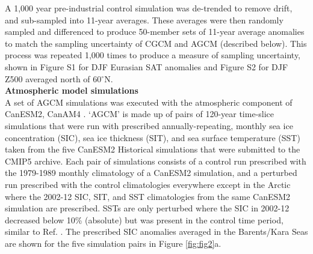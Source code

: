 \documentclass{nature}
\begin{document}
\begin{methods}
A 1,000 year pre-industrial control simulation was de-trended to remove drift, and sub-sampled into 11-year averages. These averages were then randomly sampled and differenced to produce 50-member sets of 11-year average anomalies to match the sampling uncertainty of CGCM and AGCM (described below). This process was repeated 1,000 times to produce a measure of sampling uncertainty, shown in Figure S1 for DJF Eurasian SAT anomalies and Figure S2 for DJF Z500 averaged north of 60$^\circ$N.
\\
\textbf{Atmospheric model simulations}\\
A set of AGCM simulations was executed with the atmospheric component of CanESM2, CanAM4 \cite{vonsalzen13}. `AGCM' is made up of pairs of 120-year time-slice simulations that were run with prescribed annually-repeating, monthly sea ice concentration (SIC), sea ice thickness (SIT), and sea surface temperature (SST) taken from the five CanESM2 Historical simulations that were submitted to the CMIP5 archive. Each pair of simulations consists of a control run prescribed with the 1979-1989 monthly climatology of a CanESM2 simulation, and a perturbed run prescribed with the control climatologies everywhere except in the Arctic where the 2002-12 SIC, SIT, and SST climatologies from the same CanESM2 simulation are prescribed. SSTs are only perturbed where the SIC in 2002-12 decreased below 10\% (absolute) but was present in the control time period, similar to Ref. \cite{screen14a}. The prescribed SIC anomalies averaged in the Barents/Kara Seas are shown for the five simulation pairs in Figure \ref{fig:fig2}a.


\end{methods}
\end{document}
